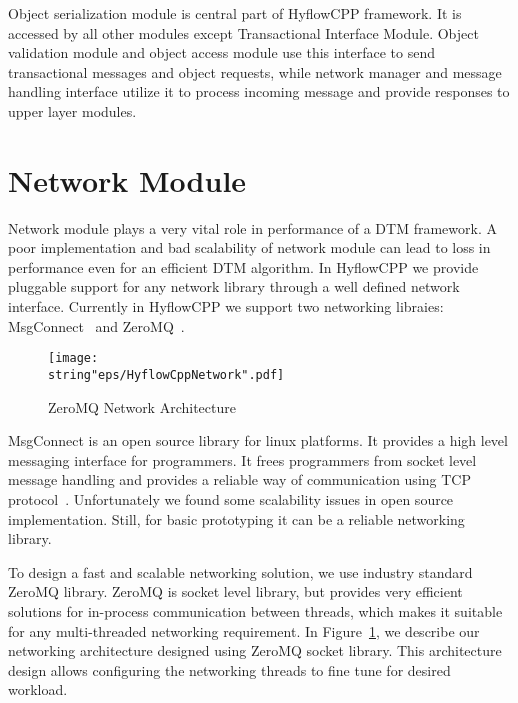 \documentclass[12pt,english]{report}
\begin{document}
Object serialization module is central part of HyflowCPP framework. It is accessed by all other modules except Transactional Interface Module. Object validation module and object access module use this interface to send transactional messages and object requests, while network manager and message handling interface utilize it to process incoming message and provide responses to upper layer modules.

\section{Network Module}

Network module plays a very vital role in performance of a DTM framework. A poor implementation and bad scalability of network module can lead to loss in performance even for an efficient DTM algorithm. In HyflowCPP we provide pluggable support for any network library through a well defined network interface. Currently in HyflowCPP we support two networking libraies: MsgConnect~\cite{MsgConnect:2012} and ZeroMQ~\cite{hintjens2011omq}.  

\begin{figure}
\begin{minipage}[b]{0.9\linewidth}\centering
\centering \texttt{[image: \\string"eps/HyflowCppNetwork".pdf]}
\caption{ZeroMQ Network Architecture}
\label{Fig:HyflowCppNetwork}
\end{minipage}
\end{figure}

MsgConnect is an open source library for linux platforms. It provides a high level messaging interface for programmers. It frees programmers from socket level message handling and provides a reliable way of communication using TCP protocol~\cite{forouzan2002tcp}. Unfortunately we found some scalability issues in open source implementation. Still, for basic prototyping it can be a reliable networking library.

To design a fast and scalable networking solution, we use industry standard ZeroMQ library. ZeroMQ is socket level library, but provides very efficient solutions for in-process communication between threads, which makes it suitable for any multi-threaded networking requirement. In Figure~\ref{Fig:HyflowCppNetwork}, we describe our networking architecture designed using ZeroMQ socket library. This architecture design allows configuring the networking threads to fine tune for desired workload. 
\end{document}
